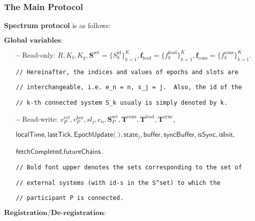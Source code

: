 \subsubsection{The Main Protocol}
\textbf{Spectrum protocol} is as follows:\label{apndx:spectrum-protocol}
\begin{protocol}
    \caption{$\textsf{Spectrum}(P, \text{sid}; \mathcal{G}_{\text{Ledger}}, \mathcal{G}_{\text{ImpLClock}}, \mathcal{H}, \mathcal{F}^{\Delta}_{\text{N-MC}})$}
    \begin{algorithmic}
        \State $\textbf{Global variables:}$
        \begin{itemize}
            \item[\textbf{--}] Read-only: $R, K_{\text{f}}, K_{\text{g}}, \mathbf{S}^{\text{set}} = \{S_k^{\text{id}}\}_{k=1}^K, \mathbf{f}_{\text{lead}} = \{f^{\text{lead}}_k\}_{k=1}^K, \mathbf{f}_{\text{cons}} = \{f^{\text{cons}}_k\}_{k=1}^K$.
            \item[] \lstinline|// Hereinafter, the indices and values of epochs and slots are|
            \item[] \lstinline|// interchangeable, i.e. e_n = n, s_j = j.  Also, the id of the|
            \item[]  \lstinline|// k-th connected system S_k usualy is simply denoted by k.|
            \item[\textbf{--}] Read-write: $v^{\text{vrf}}_P, v^{\text{kes}}_P, sl_j, e_n, \mathbf{S}_P^{\text{set}}, \mathbf{T}^{\text{cons}},  \mathbf{T}^{\text{lead}}, \mathbf{T}^{\text{sync}},$
            \item[] $\textsf{localTime}, \textsf{lastTick}, \textsf{EpochUpdate(.)}, \textsf{state}_{j}, \textsf{buffer}, \textsf{syncBuffer}, \textsf{isSync}, \textsf{isInit},$
            \item[] $\textsf{fetchCompleted}, \textsf{futureChains}$.
            \item[]  \lstinline|// Bold font upper denotes the sets corresponding to the set of|
            \item[]  \lstinline|// external systems (with id-s in the S^set) to which the|
            \item[]  \lstinline|// participant P is connected.|
        \end{itemize}
        \State $\textbf{Registration/De-registration:}$


\end{algorithmic}
\end{protocol}
